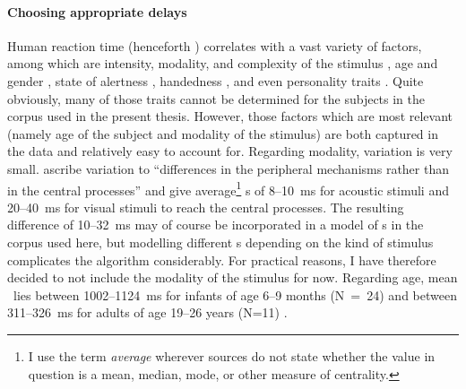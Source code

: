 \paragraph{Choosing appropriate delays}  %
Human reaction time (henceforth \rt) correlates with a vast variety of factors, among which are intensity, modality, and complexity of the stimulus \citep{brebner80}, age and gender \citep{der06}, state of alertness \citep{appelle74}, handedness \citep{dane03}, and even personality traits \citep{stelmack93}. Quite obviously, many of those traits cannot be determined for the subjects in the corpus used in the present thesis. However, those factors which are most relevant (namely age of the subject and modality of the stimulus) are both captured in the data and relatively easy to account for. Regarding modality, variation is very small. \citet[]{brebner80} ascribe variation to ``differences in the peripheral mechanisms rather than in the central processes'' and give average\footnote{I use the term \emph{average} wherever sources do not state whether the value in question is a mean, median, mode, or other measure of centrality.} \rt s of 8--10~ms for acoustic stimuli and 20--40~ms for visual stimuli to reach the central processes. The resulting difference of 10--32~ms may of course be incorporated in a model of \rt s in the corpus used here, but modelling different \rt s depending on the kind of stimulus complicates the algorithm considerably. For practical reasons, I have therefore decided to not include the modality of the stimulus for now. Regarding age, mean \rt\ lies  between 1002--1124~ms for infants of age 6--9 months (N~=~24) and between 311--326~ms for adults of age 19--26 years (N=11) \citep[]{leibold02}.%
